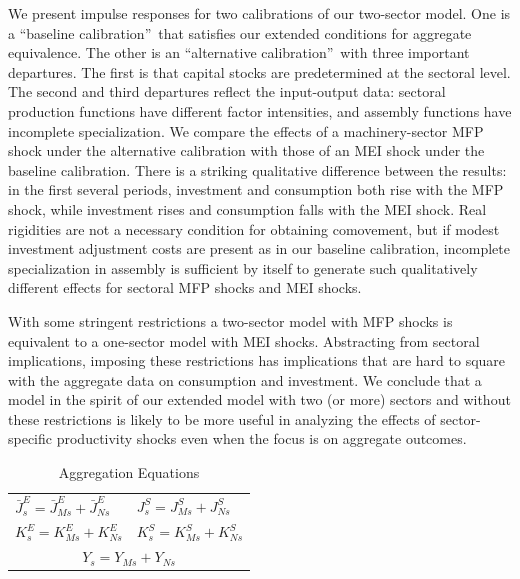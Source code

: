 \documentclass[12pt,fleqn]{article}
\renewcommand{\baselinestretch}{1.5}
\begin{document}
{\normalsize We present impulse responses for two calibrations of
our two-sector model. One is a \textquotedblleft baseline
calibration\textquotedblright\ that satisfies our extended
conditions for aggregate equivalence. The other is an
\textquotedblleft alternative calibration\textquotedblright\ with
three important departures. The first is that capital stocks are
predetermined at the sectoral level. The second and third departures
reflect the input-output data: sectoral production functions have
different factor intensities, and assembly functions have incomplete
specialization. We compare the effects of a machinery-sector MFP
shock under the alternative calibration with those of an MEI shock
under the baseline calibration. There is a striking qualitative
difference between the results: in the first several periods,
investment and consumption both rise with the MFP shock, while
investment rises and consumption falls with the MEI shock. Real
rigidities are not a necessary condition for obtaining comovement,
but if modest investment adjustment costs are present as in our
baseline calibration, incomplete specialization in assembly is
sufficient by itself to generate such qualitatively different
effects for sectoral MFP shocks and MEI shocks.}

{\normalsize With some stringent restrictions a two-sector model with MFP
shocks is equivalent to a one-sector model with MEI shocks. Abstracting from
sectoral implications, imposing these restrictions has implications that are
hard to square with the aggregate data on consumption and investment. We conclude that a model in the spirit of our extended model
with two (or more) sectors and without these restrictions is likely to be
more useful in analyzing the effects of sector-specific productivity shocks
even when the focus is on aggregate outcomes. }

\clearpage


\renewcommand{\baselinestretch}{1}
 \normalsize


\clearpage

\renewcommand{\baselinestretch}{1.5} \normalsize

\begin{table}
\center \caption{Aggregation Equations} \label{aggregation_table}
\vspace{0.5cm}
\begin{tabular}{|l|l|}
\hline
$\bar{J}^E_s = \bar{J}^E_{Ms} + \bar{J}^E_{Ns}$ & $J^S_s = J^S_{Ms} + J^S_{Ns}$ \\
$K^E_s = K^E_{Ms} + K^E_{Ns}$ & $K^S_s = K^S_{Ms} + K^S_{Ns}$ \\
\hline
\multicolumn{2}{|c|}{$Y_s = Y_{Ms}+Y_{Ns} $}  \\
\hline
\end{tabular}
\end{table}
\end{document}
